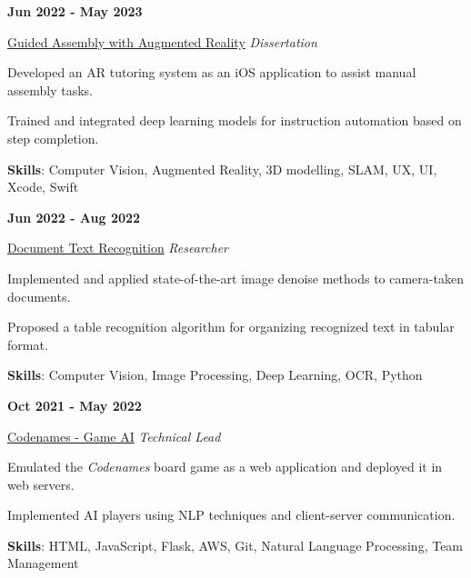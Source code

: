 \documentclass[9pt,a4paper]{article} %
\newenvironment{itemize-noindent}
{
\setlength{\leftmargini}{1em}
\begin{itemize}
\setlength{\itemsep}{0pt}
\setlength{\parskip}{0pt}
}
{\end{itemize}}
\begin{document}
\begin{multicols}{2}

\textbf{Jun 2022 - May 2023}

\href{https://github.com/Stx666Michael/LEGOAssemblyGuideAR}{Guided Assembly with Augmented Reality} \hfill \textit{Dissertation}

\begin{itemize-noindent}
    \item Developed an AR tutoring system as an iOS application to assist manual assembly tasks.
    \item Trained and integrated deep learning models for instruction automation based on step completion.
    \item \textbf{Skills}: Computer Vision, Augmented Reality, 3D modelling, SLAM, UX, UI, Xcode, Swift
\end{itemize-noindent}
\vspace{2mm}


\textbf{Jun 2022 - Aug 2022}

\href{https://github.com/Stx666Michael/DocumentDenoise}{Document Text Recognition} \hfill \textit{Researcher}

\begin{itemize-noindent}
    \item Implemented and applied state-of-the-art image denoise methods to camera-taken documents.
    \item Proposed a table recognition algorithm for organizing recognized text in tabular format.
    \item \textbf{Skills}: Computer Vision, Image Processing, Deep Learning, OCR, Python
\end{itemize-noindent}
\vspace{2mm}


\textbf{Oct 2021 - May 2022}

\href{https://github.com/Stx666Michael/Codenames_Multiplayer_AI_Online}{Codenames - Game AI} \hfill \textit{Technical Lead}

\begin{itemize-noindent}
    \item Emulated the \textit{Codenames} board game as a web application and deployed it in web servers.
    \item Implemented AI players using NLP techniques and client-server communication.
    \item \textbf{Skills}: HTML, JavaScript, Flask, AWS, Git, Natural Language Processing, Team Management
\end{itemize-noindent}
\vspace{2mm}


\end{multicols}
\end{document}
